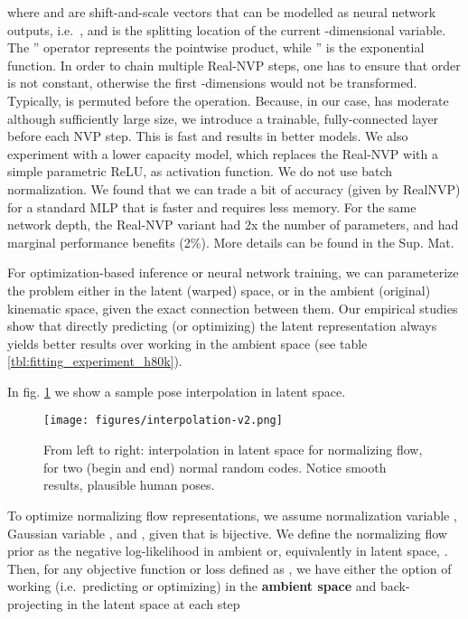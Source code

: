 \documentclass[runningheads]{llncs}
\newcommand{\ie}{i.e.\ }
\begin{document}
where  and  are shift-and-scale vectors that can be modelled as neural network outputs,
\ie , and  is the splitting location of the current -dimensional variable. The '' operator represents the pointwise product, while '' is the exponential function. In order to chain multiple Real-NVP steps, one has to ensure that order is not constant, otherwise the first -dimensions would not be transformed. Typically,  is permuted before the operation. Because, in our case,  has moderate although sufficiently large size, we introduce a trainable, fully-connected layer before each NVP step. This is fast and results in better models. We also experiment with a lower capacity model, which replaces the Real-NVP with a simple parametric ReLU, as activation function. We do not use batch normalization. We found that we can trade a bit of accuracy (given by RealNVP) for a standard MLP that is faster and requires less memory.  For the same network depth, the Real-NVP variant had 2x the number of parameters, and had marginal performance benefits (2\%). More details can be found in the Sup. Mat.

For optimization-based inference or neural network training, we can parameterize the problem either in the latent (warped) space, or in the ambient (original) kinematic space, given the exact connection between them. Our empirical studies show that directly predicting (or optimizing) the latent representation always yields better results over working in the ambient space (see table \ref{tbl:fitting_experiment_h80k}).

In fig. \ref{fig:interpolation} we show a sample pose interpolation in latent space.
\begin{figure}[!ht]
\begin{center}
    \texttt{[image: figures/interpolation-v2.png]}
\end{center}
\caption{\small From left to right: interpolation in latent space for normalizing flow, for two (begin and end) normal random codes. Notice smooth results, plausible human poses.}
\label{fig:interpolation}
\end{figure}

 To optimize normalizing flow representations, we assume normalization variable , Gaussian variable , and , given that  is bijective. We define the normalizing flow prior as the negative log-likelihood in ambient  or, equivalently in latent space, . Then, for any objective function or loss defined as , we have either the option of working (\ie predicting or optimizing) in the \textbf{ambient space} and back-projecting in the latent space at each step
\end{document}
